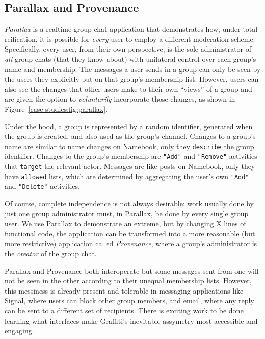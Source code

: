 \subsection{Parallax and Provenance}

\emph{Parallax} is a realtime group chat application that demonstrates
how, under total reification, it is possible for \emph{every} user to employ a different
moderation scheme.
Specifically,
every user, from their own perspective,
is the sole administrator of \emph{all} group chats (that they know about) with
unilateral control over each group's name and membership.
The messages a user sends in a group can only be seen by the users they explicitly
put on that group's membership list.
However, users can also see the changes that other users
make to their own ``views'' of a group and are given the option
to \emph{voluntarily} incorporate those changes,
as shown in Figure~\ref{case-studies:fig:parallax}.

Under the hood, a group is represented by a random identifier,
generated when the group is created, and also used as the group's channel.
Changes to a group's name are similar to name changes on Namebook, only they
\texttt{describe} the group identifier.
Changes to the group's membership are \texttt{"Add"}
and \texttt{"Remove"} activities that \texttt{target} the relevant actor.
Messages are like posts on Namebook, only they have \texttt{allowed} lists, which are determined
by aggregating the user's own \texttt{"Add"} and \texttt{"Delete"} activities.

Of course, complete independence is not always desirable:
work usually done by just one group administrator must, in Parallax,
be done by every single group user.
We use Parallax to demonstrate an extreme, but by changing X lines of functional code,
the application can be transformed into a more reasonable (but more restrictive) application called \emph{Provenance},
where a group's administrator is the  \emph{creator} of the group chat.


Parallax and Provenance both interoperate
but some messages sent from one will not be seen in the other
according to their unequal membership lists. However, this messiness is already present and tolerable
in messaging applications like Signal, where users can block other group members,
and email, where any reply can be sent to a different set of recipients.
There is exciting work to be done learning what interfaces make
Graffiti's inevitable assymetry most accessible and engaging.

